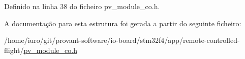 Definido na linha 38 do ficheiro pv\-\_\-module\-\_\-co.\-h.



A documentação para esta estrutura foi gerada a partir do seguinte ficheiro\-:\begin{DoxyCompactItemize}
\item 
/home/iuro/git/provant-\/software/io-\/board/stm32f4/app/remote-\/controlled-\/flight/\hyperlink{pv__module__co_8h}{pv\-\_\-module\-\_\-co.\-h}\end{DoxyCompactItemize}
